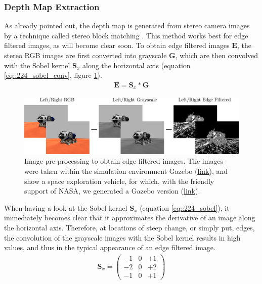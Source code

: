 \subsubsection{Depth Map Extraction}
As already pointed out, the depth map is generated from stereo camera images by a technique called stereo block matching \cite{hamzah2010sum}. This method works best for edge filtered images, as will become clear soon. To obtain edge filtered images $\bm{E}$, the stereo RGB images are first converted into grayscale $\bm{G}$, which are then convolved with the Sobel kernel $\bm{S}_x$ along the horizontal axis \cite{sobel2014an} (equation \ref{eq::224_sobel_conv}, figure \ref{fig::224_image_preprocessing}). 
\begin{align}
	\bm{E} = \bm{S}_x*\bm{G}
	\label{eq::224_sobel_conv}
\end{align}
\begin{figure}[h!]
	\centering
	\includegraphics[scale=.28]{chapters/02_background/img/image_preprocessing.png}
	\caption{Image pre-processing to obtain edge filtered images. The images were taken within the simulation environment Gazebo (\href{http://gazebosim.org/}{\underline{link}}), and show a space exploration vehicle, for which, with the friendly support of NASA, we generated a Gazebo version (\href{https://github.com/mhubii/gazebo_models}{\underline{link}}).}
	\label{fig::224_image_preprocessing}
\end{figure}
When having a look at the Sobel kernel $\bm{S}_x$ (equation \ref{eq::224_sobel}), it immediately becomes clear that it approximates the derivative of an image along the horizontal axis. Therefore, at locations of steep change, or simply put, edges, the convolution of the grayscale images with the Sobel kernel results in high values, and thus in the typical appearance of an edge filtered image.
\begin{align}
	\bm{S}_x=
	\begin{pmatrix}
		-1 & 0 & +1 \\
		-2 & 0 & +2 \\
		-1 & 0 & +1
	\end{pmatrix}
	\label{eq::224_sobel}
\end{align}
